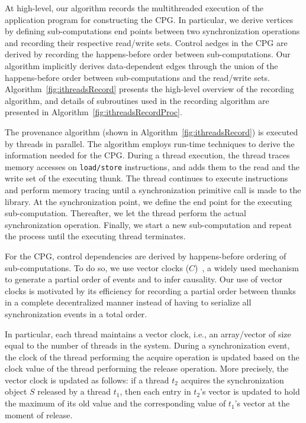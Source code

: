  
 
At high-level, our algorithm records the multithreaded execution of the
application program for constructing the CPG.
In particular, we derive vertices  by defining
sub-computations end points between two synchronization operations and recording their respective read/write sets. Control aedges in the CPG are derived by recording the happens-before order between sub-computations. Our algorithm implicitly derives data-dependent edges through the union of the happens-before order between sub-computations and the read/write sets. Algorithm~\ref{fig:ithreadsRecord} presents the high-level
overview of the recording algorithm, and details of subroutines used in the recording algorithm are presented in Algorithm~\ref{fig:ithreadsRecordProc}.
  

   The provenance algorithm (shown in Algorithm~\ref{fig:ithreadsRecord}) is executed by threads in parallel. The algorithm employs run-time techniques to derive the information needed for the CPG. During a thread execution, the thread traces memory accesses on {\tt load/store} instructions, and adds them to the read and
the write set of the executing thunk. The thread continues to execute instructions and perform memory tracing until a synchronization primitive call is made to the \pthreads  library. At the synchronization point, we define the end point for the executing sub-computation. 
Thereafter, we let the thread perform the actual synchronization operation.
Finally, we start a new sub-computation and repeat the process until the executing thread
terminates. 

 
 

 For the CPG, control dependencies are derived by 
happens-before ordering of sub-computations. To do so, we use vector clocks
($C$)~\cite{Mattern89virtualtime},  a widely used mechanism to generate a partial order of events and to infer causality. Our use of vector
clocks is motivated by its efficiency for recording a partial order between thunks in a complete decentralized manner instead of having to serialize all synchronization events in a total order.

In particular, each thread maintains a vector clock, i.e., an array/vector of size equal to the number of threads in the system.  
During a synchronization event, the clock of the thread performing the
acquire operation is updated based on the clock value of the thread performing
the release operation.  More precisely, the vector clock is updated as follows: if a thread $t_2$ acquires the synchronization
object $S$ released by a thread $t_1$, then each entry in $t_2$'s vector is
updated to hold the maximum of its old value and the corresponding value of
$t_1$'s vector at the moment of release.




